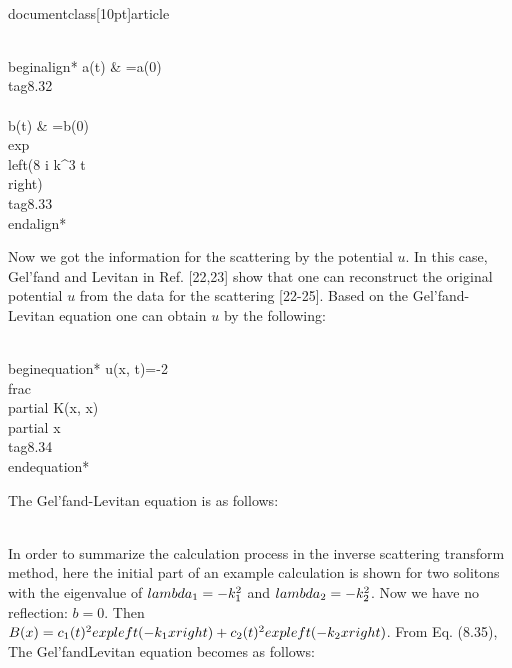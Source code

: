 \\documentclass[10pt]{article}
\begin{document}
{{{{{\\begin{align*}
a(t) & =a(0)  \\tag{8.32}\\\\
b(t) & =b(0) \\exp \\left(8 i k^{3} t\\right) \\tag{8.33}
\\end{align*}


Now we got the information for the scattering by the potential $u$. In this case, Gel'fand and Levitan in Ref. [22,23] show that one can reconstruct the original potential $u$ from the data for the scattering [22-25]. Based on the Gel'fand-Levitan equation one can obtain $u$ by the following:


\\begin{equation*}
u(x, t)=-2 \\frac{\\partial K(x, x)}{\\partial x} \\tag{8.34}
\\end{equation*}


The Gel'fand-Levitan equation is as follows:

\\[
\\begin{array}{r}
\\qquad K(x, y)+B(x+y)+\\int_{x}^{\\infty} K(x, z) B(y+z) \\mathrm{d} z=0 \\\\
\\text { Here } B(x)=\\frac{1}{2 \\pi} \\int_{-\\infty}^{\\infty} d k b(k) \\exp (\\mathrm{ikx})+\\sum_{n} c_{n}^{2} \\exp \\left(-k_{n} x\\right) . \\tag{8.36}
\\end{array}
\\]

In order to summarize the calculation process in the inverse scattering transform method, here the initial part of an example calculation is shown for two solitons with the eigenvalue of $\\lambda_{1}=-k_{1}^{2}$ and $\\lambda_{2}=-k_{2}^{2}$. Now we have no reflection: $b=0$. Then $B(x)=c_{1}(t)^{2} \\exp \\left(-k_{1} x\\right)+c_{2}(t)^{2} \\exp \\left(-k_{2} x\\right)$. From Eq. (8.35), The Gel'fandLevitan equation becomes as follows:


}}}}}
\end{document}
